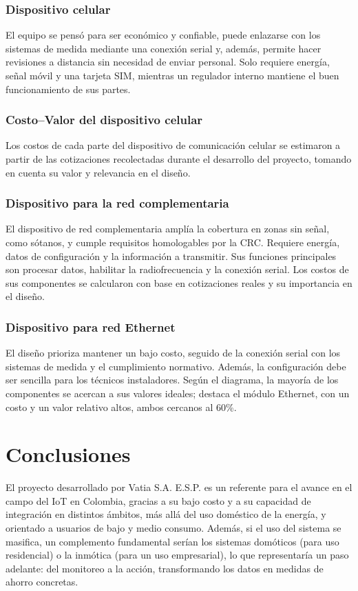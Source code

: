 \subsubsection{Dispositivo celular}
El equipo se pensó para ser económico y confiable, puede enlazarse con los sistemas de medida mediante una conexión serial y, además, permite hacer revisiones a distancia sin necesidad de enviar personal. Solo requiere energía, señal móvil y una tarjeta SIM, mientras un regulador interno mantiene el buen funcionamiento de sus partes.

\subsubsection{Costo–Valor del dispositivo celular}
Los costos de cada parte del dispositivo de comunicación celular se estimaron a partir de las cotizaciones recolectadas durante el desarrollo del proyecto, tomando en cuenta su valor y relevancia en el diseño.

\subsubsection{Dispositivo para la red complementaria}
El dispositivo de red complementaria amplía la cobertura en zonas sin señal, como sótanos, y cumple requisitos homologables por la CRC. Requiere energía, datos de configuración y la información a transmitir. Sus funciones principales son procesar datos, habilitar la radiofrecuencia y la conexión serial. Los costos de sus componentes se calcularon con base en cotizaciones reales y su importancia en el diseño.

\subsubsection{Dispositivo para red Ethernet}
El diseño prioriza mantener un bajo costo, seguido de la conexión serial con los sistemas de medida y el cumplimiento normativo. Además, la configuración debe ser sencilla para los técnicos instaladores. Según el diagrama, la mayoría de los componentes se acercan a sus valores ideales; destaca el módulo Ethernet, con un costo y un valor relativo altos, ambos cercanos al 60\%.

\section{Conclusiones}
El proyecto desarrollado por Vatia S.A. E.S.P. es un referente para el avance en el campo del IoT en Colombia, gracias a su bajo costo y a su capacidad de integración en distintos ámbitos, más allá del uso doméstico de la energía, y orientado a usuarios de bajo y medio consumo. Además, si el uso del sistema se masifica, un complemento fundamental serían los sistemas domóticos (para uso residencial) o la inmótica (para un uso empresarial), lo que representaría un paso adelante: del monitoreo a la acción, transformando los datos en medidas de ahorro concretas.